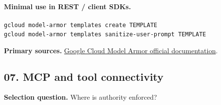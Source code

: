 \paragraph{Minimal use in REST / client SDKs.}
\begin{Verbatim}[fontsize=\scriptsize]
gcloud model-armor templates create TEMPLATE
gcloud model-armor templates sanitize-user-prompt TEMPLATE
\end{Verbatim}
\textbf{Primary sources.} \href{https://cloud.google.com/security-command-center/docs/model-armor-overview}{Google Cloud Model Armor official documentation}.
\clearpage\subsection{07. MCP and tool connectivity}
\textbf{Selection question.} Where is authority enforced?
\begin{center}\end{center}

